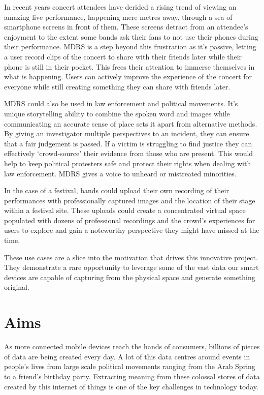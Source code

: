 \documentclass{l3proj}
\begin{document}
In recent years concert attendees have derided a rising trend of viewing an amazing live performance, happening mere metres away, through a sea of smartphone screens in front of them. These screens detract from an attendee's enjoyment to the extent some bands ask their fans to not use their phones during their performance. MDRS is a step beyond this frustration as it's passive, letting a user record clips of the concert to share with their friends later while their phone is still in their pocket. This frees their attention to immerse themselves in what is happening. Users can actively improve the experience of the concert for everyone while still creating something they can share with friends later.

MDRS could also be used in law enforcement and political movements. It's unique storytelling ability to combine the spoken word and images while communicating an accurate sense of place sets it apart from alternative methods. By giving an investigator multiple perspectives to an incident, they can ensure that a fair judgement is passed. If a victim is struggling to find justice they can effectively ‘crowd-source’ their evidence from those who are present. This would help to keep political protesters safe and protect their rights when dealing with law enforcement. MDRS gives a voice to unheard or mistreated minorities.

In the case of a festival, bands could upload their own recording of their performances with professionally captured images and the location of their stage within a festival site. These uploads could create a concentrated virtual space populated with dozens of  professional recordings and the crowd’s experiences for users to explore and gain a noteworthy perspective they might have missed at the time.

These use cases are a slice into the motivation that drives this innovative project. They demonstrate a rare opportunity to leverage some of the vast data our smart devices are capable of capturing from the physical space and generate something original.

\section{Aims}
As more connected mobile devices reach the hands of consumers, billions of pieces of data are being created every day. A lot of this data centres around events in people’s lives from large scale political movements ranging from the Arab Spring to a friend's birthday party. Extracting meaning from these colossal stores of data created by this internet of things is one of the key challenges in technology today.
\end{document}
